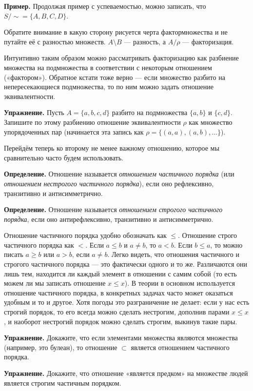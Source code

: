 {\bfseries Пример.} Продолжая пример с успеваемостью, можно записать, что $S/\sim = \{A, B, C, D\}$.

Обратите внимание в какую сторону рисуется черта фактормножества и не путайте её с разностью множеств. $A\setminus B$ — разность, а $A/\rho$ — факторизация.

Интуитивно таким образом можно рассматривать факторизацию как разбиение множества на подмножества в соответствии с некоторым отношением («фактором»). Обратное кстати тоже верно — если множество разбито на непересекающиеся подмножества, то по ним можно задать отношение эквивалентности.

{\bfseries Упражнение.} Пусть $A = \{a, b, c, d\}$ разбито на подмножества $\{a, b\}$ и $\{c, d\}$. Запишите по этому разбиению отношение эквивалентности $\rho$ как множество упорядоченных пар (начинается эта запись как $\rho = \{(a, a), (a, b), \ldots\}$).

Перейдём теперь ко второму не менее важному отношению, которое мы сравнительно часто будем использовать.

{\bfseries Определение.} Отношение называется {\slshape отношением частичного порядка} (или {\slshape отношением нестрогого частичного порядка}), если оно рефлексивно, транзитивно и антисимметрично.

{\bfseries Определение.} Отношение называется {\slshape отношением строгого частичного порядка}, если оно антирефлексивно, транзитивно и антисимметрично.

Отношение частичного порядка удобно обозначать как $\le$. Отношение строго частичного порядка как $<$. Если $a \le b$ и $a \not= b$, то $a<b$. Если $b \le a$, то можно писать $a \ge b$ или $a > b$, если $a\not= b$. Легко видеть, что отношения частичного и строгого частичного порядка — это фактически одного и то же. Различаются они лишь тем, находится ли каждый элемент в отношении с самим собой (то есть можем ли мы записать отношение $x\le x$). В теории в основном используется отношение частичного порядка, в конкретных задачах часто может оказаться удобным и то и другое. Хотя погоды это разграничение не делает: если у нас есть строгий порядок, то его всегда можно сделать нестрогим, дополнив парами $x\le x$, и наоборот нестрогий порядок можно сделать строгим, выкинув такие пары.

{\bfseries Упражнение.} Докажите, что если элементами множества являются множества (например, это булеан), то отношение $\subset$ является отношением частичного порядка.

{\bfseries Упражнение.} Докажите, что отношение «является предком» на множестве людей является строгим частичным порядком.

